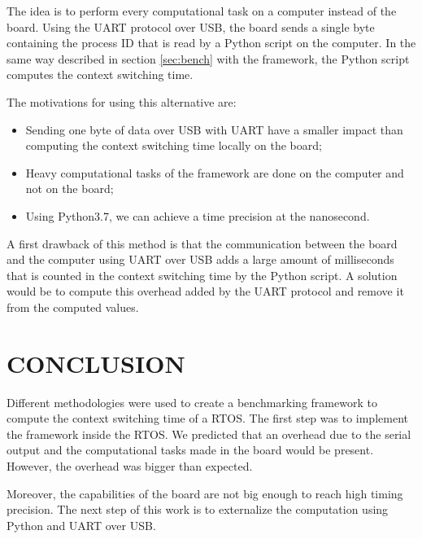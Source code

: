 \documentclass[a4paper, 10pt, conference]{ieeeconf}      %
\begin{document}
The idea is to perform every computational task on a computer instead of the board.
Using the UART protocol over USB, the board sends a single byte containing the process ID that is read by a Python script on the computer.
In the same way described in section \ref{sec:bench} with the framework, the Python script computes the context switching time.

The motivations for using this alternative are:
\begin{itemize}
    \item Sending one byte of data over USB with UART have a smaller impact than computing the context switching time locally on the board;
    \item Heavy computational tasks of the framework are done on the computer and not on the board;
    \item Using Python3.7, we can achieve a time precision at the nanosecond.
\end{itemize}

A first drawback of this method is that the communication between the board and the computer using UART over USB adds a large amount of milliseconds that is counted in the context switching time by the Python script.
A solution would be to compute this overhead added by the UART protocol and remove it from the computed values.

\section{CONCLUSION}
Different methodologies were used to create a benchmarking framework to compute the context switching time of a RTOS.
The first step was to implement the framework inside the RTOS.
We predicted that an overhead due to the serial output and the computational tasks made in the board would be present.
However, the overhead was bigger than expected.

Moreover, the capabilities of the board are not big enough to reach high timing precision.
The next step of this work is to externalize the computation using Python and UART over USB.

\addtolength{\textheight}{-12cm}   %









\end{document}
